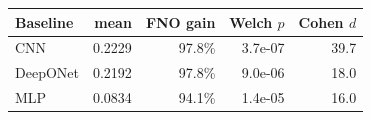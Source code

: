 \begin{tabular}{lrrrr}
\toprule
Baseline & mean & FNO gain & Welch $p$ & Cohen $d$ \\
\midrule
CNN & 0.2229 & 97.8\% & 3.7e-07 & 39.7 \\
DeepONet & 0.2192 & 97.8\% & 9.0e-06 & 18.0 \\
MLP & 0.0834 & 94.1\% & 1.4e-05 & 16.0 \\
\bottomrule
\end{tabular}
